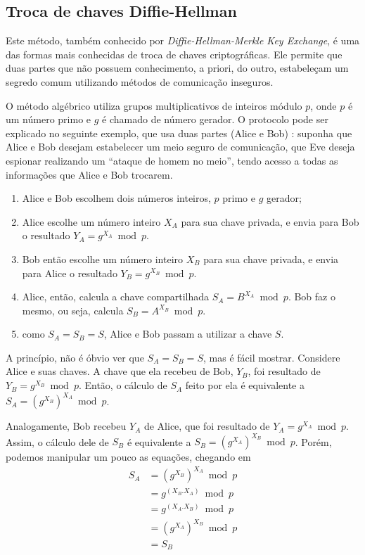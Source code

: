 
\subsection*{Troca de chaves Diffie-Hellman}

Este método, também conhecido por \emph{Diffie-Hellman-Merkle Key Exchange}, é uma das
formas mais conhecidas de troca de chaves criptográficas. Ele permite que duas partes
que não possuem conhecimento, a priori, do outro, estabeleçam um segredo comum
utilizando métodos de comunicação inseguros.

O método algébrico utiliza grupos multiplicativos de inteiros módulo $p$, onde $p$ é um
número primo e $g$ é chamado de número gerador. O protocolo pode ser explicado no
seguinte exemplo, que usa duas partes (Alice e Bob)
\cite{book:schneier,artigo:diffiehellman}: suponha que Alice e Bob desejam estabelecer
um meio seguro de comunicação, que Eve deseja espionar realizando um ``ataque de homem
no meio'', tendo acesso a todas as informações que Alice e Bob trocarem.

\begin{enumerate}
    \item Alice e Bob escolhem dois números inteiros, $p$ primo e $g$ gerador;

    \item Alice escolhe um número inteiro $X_{A}$ para sua chave privada, e envia para
        Bob o resultado $Y_{A} = g^{X_{A}} \bmod p$.

    \item Bob então escolhe um número inteiro $X_{B}$ para sua chave privada, e envia
        para Alice o resultado $Y_{B} = g^{X_{B}} \bmod p$.

    \item Alice, então, calcula a chave compartilhada $S_A = B^{X_{A}} \bmod p$. Bob faz
        o mesmo, ou seja, calcula $S_B = A^{X_{B}} \bmod p$.

    \item como $S_A = S_B = S$, Alice e Bob passam a utilizar a chave $S$.
\end{enumerate}

A princípio, não é óbvio ver que $S_A = S_B = S$, mas é fácil mostrar. Considere Alice e
suas chaves. A chave que ela recebeu de Bob, $Y_{B}$, foi resultado de
$Y_{B} = g^{X_{B}} \bmod p$. Então, o cálculo de $S_A$ feito por ela é equivalente a
$S_A = (g^{X_{B}})^{X_{A}} \bmod p$.

\newpage
Analogamente, Bob recebeu $Y_{A}$ de Alice, que foi resultado de
$Y_{A} = g^{X_{A}} \bmod p$. Assim, o cálculo dele de $S_B$ é equivalente a
$S_B = (g^{X_{A}})^{X_{B}} \bmod p$. Porém, podemos manipular um pouco as equações,
chegando em
\begin{align*}
S_A & = (g^{X_{B}})^{X_{A}} \bmod p \\
    & = g^{(X_{B}.X_{A})}   \bmod p \\
    & = g^{(X_{A}.X_{B})}   \bmod p \\
    & = (g^{X_{A}})^{X_{B}} \bmod p \\
    & = S_B
\end{align*}

